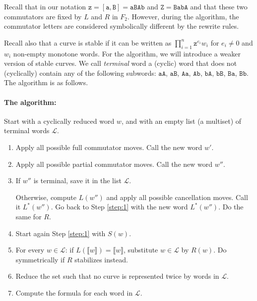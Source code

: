 \documentclass{article}
\begin{document}
	
	Recall that in our notation $\mathtt{z}=[\mathtt{a},\mathtt{B}]=\mathtt{aBAb}$ and $\mathtt{Z}=\mathtt{B abA}$ and that these two commutators are fixed by $L$ and $R$ in $F_2$. However, during the algorithm, the commutator letters are considered symbolically different by the rewrite rules.
	
	Recall also that a curve is stable if it can be written as $\prod_{i=1}^n\mathtt{z}^{e_i}w_i$ for $e_i\neq0$ and $w_i$ non-empty monotone words.  For the algorithm, we will introduce a weaker version of stable curves. We call \emph{terminal} word a (cyclic) word that does not (cyclically) contain any of the following subwords: $\mathtt{aA}$, $\mathtt{aB}$, $\mathtt{Aa}$, $\mathtt{Ab}$, $\mathtt{bA}$, $\mathtt{bB}$, $\mathtt{Ba}$, $\mathtt{Bb}$. The algorithm is as follows.
	
	\paragraph{The algorithm:} Start with a cyclically reduced word $w$, and with an empty list (a multiset) of terminal words $\mathcal{L}$.
	\begin{enumerate}
		\item\label{step:1} Apply all possible full commutator moves. Call the new word $w'$.
		\item Apply all possible partial commutator moves. Call the new word $w''$.
		\item If $w''$ is terminal, save it in the list $\mathcal{L}$.
		
		Otherwise, compute $L(w'')$ and apply all possible cancellation moves. Call it $L^*(w'')$. Go back to Step \ref{step:1} with the new word $L^*(w'')$. Do the same for $R$.
		\item Start again Step \ref{step:1} with $S(w)$.
        \item For every $w\in\mathcal L$: if $L(\llbracket w \rrbracket)=\llbracket w \rrbracket$, substitute $w\in\mathcal L$ by $R(w)$. Do symmetrically if $R$ stabilizes instead.
        \item Reduce the set such that no curve is represented twice by words in $\mathcal{L}$.
		\item Compute the formula for each word in $\mathcal{L}$. 
	\end{enumerate}
	
\end{document}

